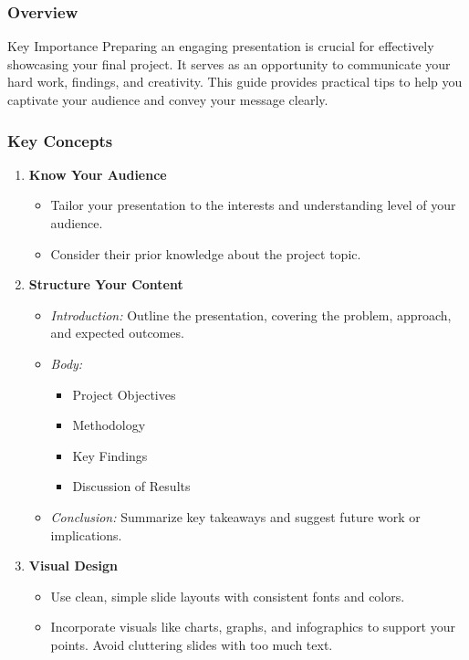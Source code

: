 \documentclass{beamer}
\begin{document}
\begin{frame}[fragile]
    \frametitle{Overview}
    \begin{block}{Key Importance}
        Preparing an engaging presentation is crucial for effectively showcasing your final project. It serves as an opportunity to communicate your hard work, findings, and creativity. This guide provides practical tips to help you captivate your audience and convey your message clearly.
    \end{block}
\end{frame}

\begin{frame}[fragile]
    \frametitle{Key Concepts}
    \begin{enumerate}
        \item \textbf{Know Your Audience}
            \begin{itemize}
                \item Tailor your presentation to the interests and understanding level of your audience.
                \item Consider their prior knowledge about the project topic.
            \end{itemize}
        
        \item \textbf{Structure Your Content}
            \begin{itemize}
                \item \textit{Introduction:} Outline the presentation, covering the problem, approach, and expected outcomes.
                \item \textit{Body:} 
                    \begin{itemize}
                        \item Project Objectives
                        \item Methodology
                        \item Key Findings
                        \item Discussion of Results
                    \end{itemize}
                \item \textit{Conclusion:} Summarize key takeaways and suggest future work or implications.
            \end{itemize}
        
        \item \textbf{Visual Design}
            \begin{itemize}
                \item Use clean, simple slide layouts with consistent fonts and colors.
                \item Incorporate visuals like charts, graphs, and infographics to support your points. Avoid cluttering slides with too much text.
            \end{itemize}
    \end{enumerate}
\end{frame}
\end{document}
